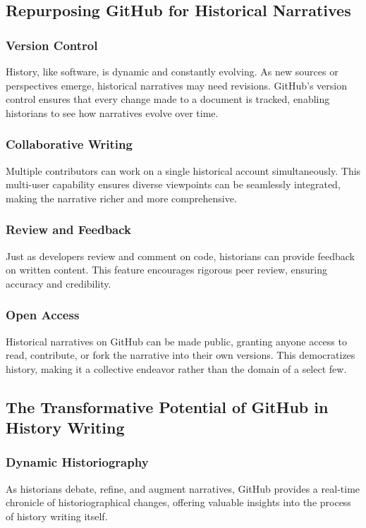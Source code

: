 \documentclass[a4paper,12pt]{book}
\begin{document}
\subsection*{Repurposing GitHub for Historical Narratives}
\subsubsection*{Version Control}
History, like software, is dynamic and constantly evolving. As new sources or perspectives emerge, historical narratives may need revisions. GitHub's version control ensures that every change made to a document is tracked, enabling historians to see how narratives evolve over time.

\subsubsection*{Collaborative Writing}
Multiple contributors can work on a single historical account simultaneously. This multi-user capability ensures diverse viewpoints can be seamlessly integrated, making the narrative richer and more comprehensive.

\subsubsection*{Review and Feedback}
Just as developers review and comment on code, historians can provide feedback on written content. This feature encourages rigorous peer review, ensuring accuracy and credibility.

\subsubsection*{Open Access}
Historical narratives on GitHub can be made public, granting anyone access to read, contribute, or fork the narrative into their own versions. This democratizes history, making it a collective endeavor rather than the domain of a select few.

\subsection*{The Transformative Potential of GitHub in History Writing}
\subsubsection*{Dynamic Historiography}
As historians debate, refine, and augment narratives, GitHub provides a real-time chronicle of historiographical changes, offering valuable insights into the process of history writing itself.
\end{document}
